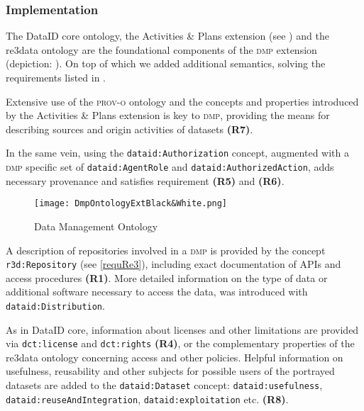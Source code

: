 \documentclass[runningheads,a4paper]{llncs}
\newcommand{\prov}{{\scshape prov-o}\xspace}
\newcommand{\dmp}{{\scshape dmp}\xspace}
\newcommand{\prop}[1]{{{\texttt{#1}}}}
\begin{document}

\subsubsection{Implementation}
\label{implDmp}
The DataID core ontology, the Activities \& Plans extension (see ) and the re3data ontology are the foundational components of the \dmp extension (depiction: ). On top of which we added additional semantics, solving the requirements listed in .

Extensive use of the \prov ontology and the concepts and properties introduced by the Activities \& Plans extension is key to \dmp, providing the means for describing sources and origin activities of datasets \textbf{(R7)}.

In the same vein, using the \prop{dataid:Authorization} concept, augmented with a \dmp specific set of \prop{dataid:AgentRole} and \prop{dataid:AuthorizedAction}, adds necessary provenance and satisfies requirement \textbf{(R5)} and \textbf{(R6)}.

\begin{figure}
\centering
\texttt{[image: DmpOntologyExtBlack\&White.png]}
  \caption{Data Management Ontology}
  \label{fig:dmp}
  \vspace{-1.5em}
\end{figure}

A description of repositories involved in a \dmp is provided by the concept \prop{r3d:Repository} (see \ref{requRe3}), including exact documentation of APIs and access procedures \textbf{(R1)}. More detailed information on the type of data or additional software necessary to access the data, was introduced with \prop{dataid:Distribution}.

As in DataID core, information about licenses and other limitations are provided via \prop{dct:license} and \prop{dct:rights} \textbf{(R4)}, or the complementary properties of the re3data ontology concerning access and other policies.
Helpful information on usefulness, reusability and other subjects for possible users of the portrayed datasets are added to the \prop{dataid:Dataset} concept: \prop{dataid:usefulness}, \prop{dataid:reuseAndIntegration}, \prop{dataid:exploitation} etc. \textbf{(R8)}.
\end{document}
